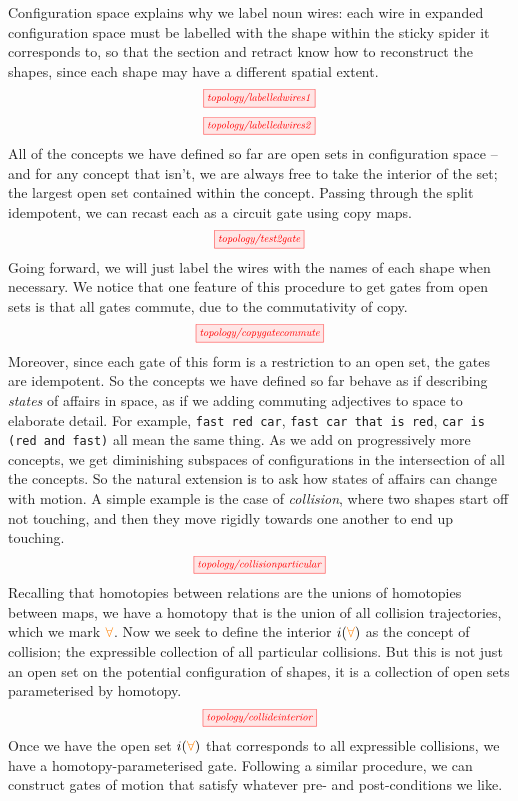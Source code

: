 Configuration space explains why we label noun wires: each wire in expanded configuration space must be labelled with the shape within the sticky spider it corresponds to, so that the section and retract know how to reconstruct the shapes, since each shape may have a different spatial extent.
\[\scalebox{0.75}{\tikzfig{topology/labelledwires1}}\]
\[\scalebox{0.75}{\tikzfig{topology/labelledwires2}}\]
All of the concepts we have defined so far are open sets in configuration space -- and for any concept that isn't, we are always free to take the interior of the set; the largest open set contained within the concept. Passing through the split idempotent, we can recast each as a circuit gate using copy maps.
\[\scalebox{0.75}{\tikzfig{topology/test2gate}}\]
Going forward, we will just label the wires with the names of each shape when necessary. We notice that one feature of this procedure to get gates from open sets is that all gates commute, due to the commutativity of copy.
\[\scalebox{0.75}{\tikzfig{topology/copygatecommute}}\]
Moreover, since each gate of this form is a restriction to an open set, the gates are idempotent. So the concepts we have defined so far behave as if describing \emph{states} of affairs in space, as if we adding commuting adjectives to space to elaborate detail. For example, \texttt{fast red car}, \texttt{fast car that is red}, \texttt{car is (red and fast)} all mean the same thing. As we add on progressively more concepts, we get diminishing subspaces of configurations in the intersection of all the concepts. So the natural extension is to ask how states of affairs can change with motion. A simple example is the case of \emph{collision}, where two shapes start off not touching, and then they move rigidly towards one another to end up touching.
\[\scalebox{0.75}{\tikzfig{topology/collisionparticular}}\]
Recalling that homotopies between relations are the unions of homotopies between maps, we have a homotopy that is the union of all collision trajectories, which we mark $\textcolor{orange}{\forall}$. Now we seek to define the interior $i(\textcolor{orange}{\forall})$ as the concept of collision; the expressible collection of all particular collisions. But this is not just an open set on the potential configuration of shapes, it is a collection of open sets parameterised by homotopy.
\[\scalebox{0.75}{\tikzfig{topology/collideinterior}}\]
Once we have the open set $i(\textcolor{orange}{\forall})$ that corresponds to all expressible collisions, we have a homotopy-parameterised gate. Following a similar procedure, we can construct gates of motion that satisfy whatever pre- and post-conditions we like.

